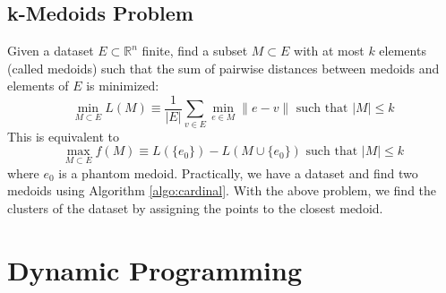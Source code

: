 \documentclass[11pt, openany]{report}
\newcommand{\R}{\mathbb{R}}
\theoremstyle{definition}
\begin{document}
\section{k-Medoids Problem}
Given a dataset $E\subset \R^n$ finite, find a subset $M\subset E$ with at most $k$ elements (called medoids) such that the sum of pairwise distances between medoids and elements of $E$ is minimized:
\begin{equation}
    \min_{M\subset E} L(M)\equiv \frac{1}{|E|}\sum_{v\in E} \min_{e\in M}\lVert e-v\rVert \text{    such that    } |M|\le k
\end{equation}
This is equivalent to 
\begin{equation}
    \max_{M\subset E} f(M)\equiv L(\{e_0\})-L(M\cup \{e_0\})\text{    such that    } |M|\le k
\end{equation}
where $e_0$ is a phantom medoid. Practically, we have a dataset and find two medoids using Algorithm \ref{algo:cardinal}. With the above problem, we find the clusters of the dataset by assigning the points to the closest medoid. 
\chapter{Dynamic Programming}
\end{document}
